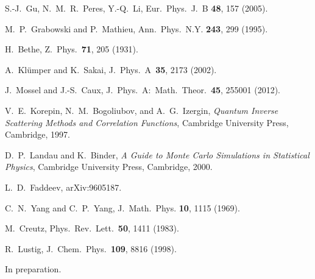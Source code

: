 \documentclass[twocolumn,superscriptaddress,prb,10pt]{revtex4-1}
\begin{document}
\begin{thebibliography}{99}
S.-J.~Gu, N.~M.~R.~Peres, Y.-Q.~Li, Eur.\ Phys.\ J.\ B {\bf 48}, 157 (2005). 

M.~P.~Grabowski and P.~Mathieu, Ann.\ Phys.\ N.Y. {\bf 243}, 
299 (1995). 

H.~Bethe, Z.\ Phys.\ {\bf 71}, 205 (1931). 

A.~Kl\"umper and K.~Sakai, J.\ Phys.\ A\ {\bf 35}, 2173 (2002).

J.~Mossel and J.-S.~Caux, J.\ Phys.\ A:\ Math.\ Theor.\ {\bf 45}, 
255001 (2012). 


V.~E.~Korepin, N.~M.~Bogoliubov, and A.~G.~Izergin, \emph{Quantum 
Inverse Scattering Methods and Correlation Functions}, Cambridge 
University Press, Cambridge, 1997. 

D.~P.~Landau and K.~Binder, \emph{A Guide to Monte Carlo Simulations in 
Statistical Physics}, Cambridge University Press, Cambridge, 2000.

L.~D.~Faddeev, arXiv:9605187.

C.~N.~Yang and C.~P.~Yang, J.\ Math.\ Phys. {\bf 10}, 1115 (1969).

M.~Creutz, Phys.\ Rev.\ Lett.\ {\bf 50}, 1411 (1983).

R.~Lustig, J.\ Chem.\ Phys.\ {\bf 109}, 8816 (1998).

In preparation. 



\end{thebibliography}
\end{document}
